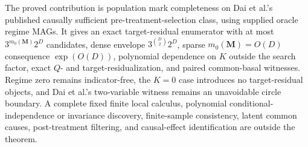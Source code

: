 The proved contribution is population mark completeness on Dai et al.'s published causally sufficient pre-treatment-selection class, using supplied oracle regime MAGs.  It gives an exact target-residual enumerator with at most \(3^{m_0(\mathbf M)}2^D\) candidates, dense envelope \(3^{\binom D2}2^D\), sparse \(m_0(\mathbf M)=O(D)\) consequence \(\exp(O(D))\), polynomial dependence on \(K\) outside the search factor, exact \(Q\)- and target-residualization, and paired common-basal witnesses.  Regime zero remains indicator-free, the \(K=0\) case introduces no target-residual objects, and Dai et al.'s two-variable witness remains an unavoidable circle boundary.  A complete fixed finite local calculus, polynomial conditional-independence or invariance discovery, finite-sample consistency, latent common causes, post-treatment filtering, and causal-effect identification are outside the theorem.